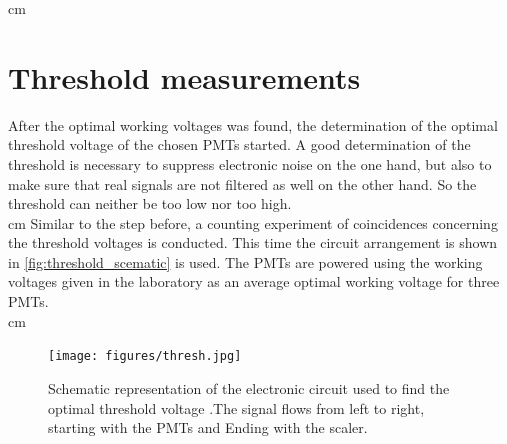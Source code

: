  cm
\section{Threshold measurements}
After the optimal working voltages was found, the determination of the optimal threshold voltage of the chosen PMTs started.
A good determination of the threshold is necessary to suppress electronic noise on the one hand, but also to make sure that real signals are not
filtered as well on the other hand. So the threshold can neither be too low nor too high.\\
 cm
Similar to the step before, a counting experiment of coincidences concerning the threshold voltages is conducted. This time the circuit arrangement is shown in 
\autoref{fig:threshold_scematic} is used. The PMTs are powered using the working voltages given 
in the laboratory as an average optimal working voltage for three PMTs. \\
 cm
\begin{figure}
   \centering
   \texttt{[image: figures/thresh.jpg]}
   \caption{Schematic representation of the electronic circuit used to find the optimal threshold voltage
   .The signal flows from left to right, starting with the PMTs and Ending with the scaler.}
   \label{fig:threshold_scematic}
\end{figure}

